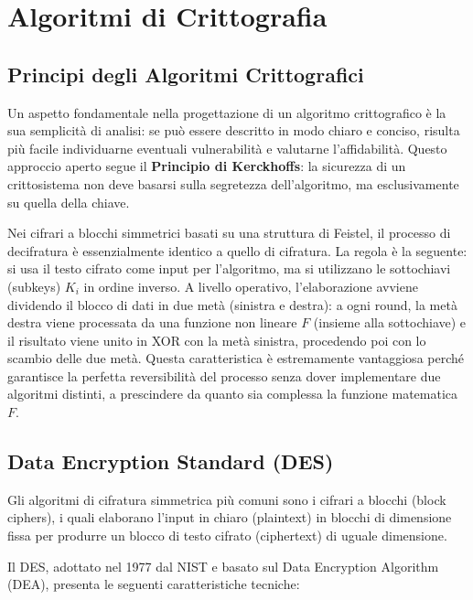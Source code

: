 \chapter{Algoritmi di Crittografia}

\section{Principi degli Algoritmi Crittografici}

Un aspetto fondamentale nella progettazione di un algoritmo crittografico è la sua semplicità di analisi: se può essere descritto in modo chiaro e conciso, risulta più facile individuarne eventuali vulnerabilità e valutarne l'affidabilità. Questo approccio aperto segue il \textbf{Principio di Kerckhoffs}: la sicurezza di un crittosistema non deve basarsi sulla segretezza dell'algoritmo, ma esclusivamente su quella della chiave.

Nei cifrari a blocchi simmetrici basati su una struttura di Feistel, il processo di decifratura è essenzialmente identico a quello di cifratura. La regola è la seguente: si usa il testo cifrato come input per l'algoritmo, ma si utilizzano le sottochiavi (subkeys) $K_i$ in ordine inverso. A livello operativo, l'elaborazione avviene dividendo il blocco di dati in due metà (sinistra e destra): a ogni round, la metà destra viene processata da una funzione non lineare $F$ (insieme alla sottochiave) e il risultato viene unito in XOR con la metà sinistra, procedendo poi con lo scambio delle due metà. Questa caratteristica è estremamente vantaggiosa perché garantisce la perfetta reversibilità del processo senza dover implementare due algoritmi distinti, a prescindere da quanto sia complessa la funzione matematica $F$.

\section{Data Encryption Standard (DES)}

Gli algoritmi di cifratura simmetrica più comuni sono i cifrari a blocchi (block ciphers), i quali elaborano l'input in chiaro (plaintext) in blocchi di dimensione fissa per produrre un blocco di testo cifrato (ciphertext) di uguale dimensione.

Il DES, adottato nel 1977 dal NIST e basato sul Data Encryption Algorithm (DEA), presenta le seguenti caratteristiche tecniche:

